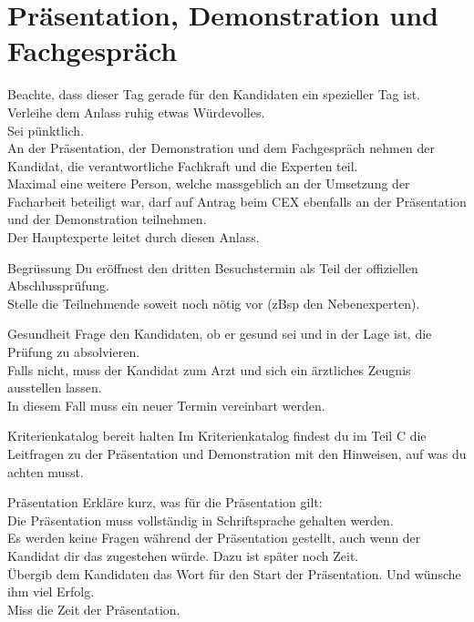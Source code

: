 \section{Präsentation, Demonstration und Fachgespräch}
Beachte, dass dieser Tag gerade für den Kandidaten ein spezieller Tag ist. Verleihe dem Anlass ruhig etwas Würdevolles.\\Sei pünktlich.\\An der Präsentation, der Demonstration und dem Fachgespräch nehmen der Kandidat, die verantwortliche Fachkraft und die Experten
teil.\\Maximal eine weitere Person, welche massgeblich an der Umsetzung der Facharbeit beteiligt war, darf auf Antrag beim CEX ebenfalls an der Präsentation und der Demonstration teilnehmen.\\Der Hauptexperte leitet durch diesen Anlass.
\begin{taskitem}{Begrüssung}
  Du eröffnest den dritten Besuchstermin als Teil der offiziellen Abschlussprüfung.\\Stelle die Teilnehmende soweit noch nötig vor (zBsp den Nebenexperten).
\end{taskitem}
\begin{taskitem}{Gesundheit}
   Frage den Kandidaten, ob er gesund sei und in der Lage ist, die Prüfung zu absolvieren.\\ Falls nicht, muss der Kandidat zum Arzt und sich ein ärztliches Zeugnis ausstellen lassen.\\In diesem Fall muss ein neuer Termin vereinbart werden.
\end{taskitem}
\begin{taskitemwithoutcomment}{Kriterienkatalog bereit halten}
  Im Kriterienkatalog findest du im Teil C die Leitfragen zu der Präsentation und Demonstration mit den Hinweisen, auf was du achten musst.
\end{taskitemwithoutcomment}
\newpage
\begin{taskitemwithoutcomment}{Präsentation}
  Erkläre kurz, was für die Präsentation gilt:\\
  Die Präsentation muss vollständig in Schriftsprache gehalten werden.\\
  Es werden keine Fragen während der Präsentation gestellt, auch wenn der Kandidat dir das zugestehen würde. Dazu ist später noch Zeit.\\Übergib dem Kandidaten das Wort für den Start der Präsentation. Und wünsche ihm viel Erfolg.\\Miss die Zeit der Präsentation.
\end{taskitemwithoutcomment}

